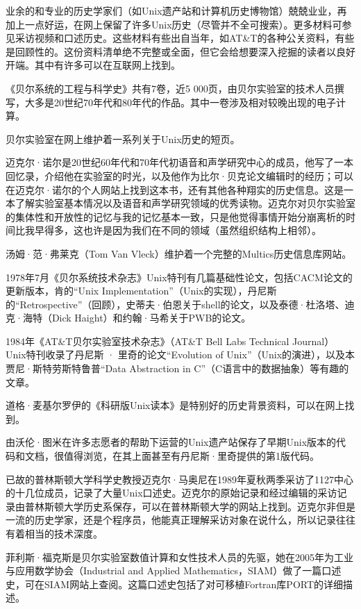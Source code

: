 \documentclass[a4paper,12pt,UTF8,twoside]{ctexbook}
\begin{document}
{{业余的和专业的历史学家们（如Unix遗产站和计算机历史博物馆）兢兢业业，再加上一点好运，在网上保留了许多Unix历史（尽管并不全可搜索）。更多材料可参见采访视频和口述历史。这些材料有些出自当年，如AT\&T的各种公关资料，有些是回顾性的。这份资料清单绝不完整或全面，但它会给想要深入挖掘的读者以良好开端。其中有许多可以在互联网上找到。

《贝尔系统的工程与科学史》共有7卷，近5 000页，由贝尔实验室的技术人员撰写，大多是20世纪70年代和80年代的作品。其中一卷涉及相对较晚出现的电子计算。

贝尔实验室在网上维护着一系列关于Unix历史的短页。

迈克尔·诺尔是20世纪60年代和70年代初语音和声学研究中心的成员，他写了一本回忆录，介绍他在实验室的时光，以及他作为比尔·贝克论文编辑时的经历；可以在迈克尔·诺尔的个人网站上找到这本书，还有其他各种翔实的历史信息。这是一本了解实验室基本情况以及语音和声学研究领域的优秀读物。迈克尔对贝尔实验室的集体性和开放性的记忆与我的记忆基本一致，只是他觉得事情开始分崩离析的时间比我早得多，这也许是因为我们在不同的领域（虽然组织结构上相邻）。

汤姆·范·弗莱克（Tom Van Vleck）维护着一个完整的Multics历史信息库网站。

1978年7月《贝尔系统技术杂志》Unix特刊有几篇基础性论文，包括CACM论文的更新版本，肯的“Unix Implementation”（Unix的实现），丹尼斯的“Retrospective”（回顾），史蒂夫·伯恩关于shell的论文，以及泰德·杜洛塔、迪克·海特（Dick Haight）和约翰·马希关于PWB的论文。

1984年《AT\&T贝尔实验室技术杂志》（AT\&T Bell Labs Technical Journal） Unix特刊收录了丹尼斯 · 里奇的论文“Evolution of Unix”（Unix的演进），以及本贾尼·斯特劳斯特鲁普“Data Abstraction in C”（C语言中的数据抽象）等有趣的文章。

道格·麦基尔罗伊的《科研版Unix读本》是特别好的历史背景资料，可以在网上找到。

由沃伦·图米在许多志愿者的帮助下运营的Unix遗产站保存了早期Unix版本的代码和文档，很值得浏览，在其上面甚至有丹尼斯·里奇提供的第1版代码。

已故的普林斯顿大学科学史教授迈克尔·马奥尼在1989年夏秋两季采访了1127中心的十几位成员，记录了大量Unix口述史。迈克尔的原始记录和经过编辑的采访记录由普林斯顿大学历史系保存，可以在普林斯顿大学的网站上找到。迈克尔非但是一流的历史学家，还是个程序员，他能真正理解采访对象在说什么，所以记录往往有着相当的技术深度。

菲利斯·福克斯是贝尔实验室数值计算和女性技术人员的先驱，她在2005年为工业与应用数学协会（Industrial and Applied Mathematics，SIAM）做了一篇口述史，可在SIAM网站上查阅。这篇口述史包括了对可移植Fortran库PORT的详细描述。

}}
\end{document}
